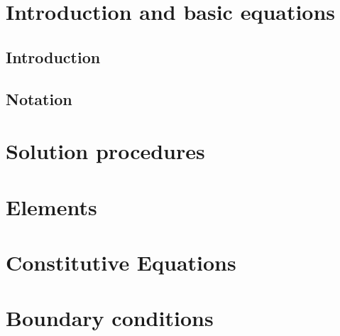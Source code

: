 \documentclass[a4paper]{book}
\begin{document}


\clearpage
\setcounter{page}{1}
\pagestyle{headings}

\tableofcontents
%
\chapter{Introduction and basic equations}
\section{Introduction}
\section{Notation}

\chapter{Solution procedures}

\chapter{Elements}
\chapter{Constitutive Equations}

\chapter{Boundary conditions}

{}



\end{document}
